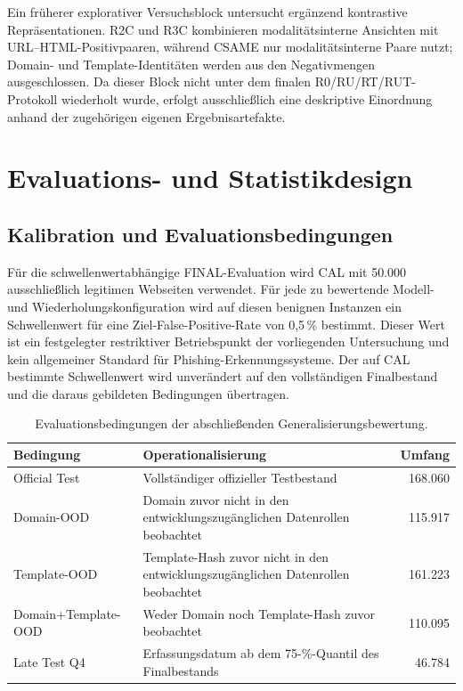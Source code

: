 Ein früherer explorativer Versuchsblock untersucht ergänzend kontrastive Repräsentationen.
R2C und R3C kombinieren modalitätsinterne Ansichten mit URL--HTML-Positivpaaren, während
CSAME nur modalitätsinterne Paare nutzt; Domain- und Template-Identitäten werden aus den
Negativmengen ausgeschlossen. Da dieser Block nicht unter dem finalen R0/RU/RT/RUT-Protokoll
wiederholt wurde, erfolgt ausschließlich eine deskriptive Einordnung anhand der
zugehörigen eigenen Ergebnisartefakte.

\section{Evaluations- und Statistikdesign}

\subsection{Kalibration und Evaluationsbedingungen}

Für die schwellenwertabhängige FINAL-Evaluation wird CAL mit 50.000 ausschließlich legitimen
Webseiten verwendet. Für jede zu bewertende Modell- und Wiederholungskonfiguration wird auf
diesen benignen Instanzen ein Schwellenwert für eine Ziel-False-Positive-Rate von 0,5\,\%
bestimmt. Dieser Wert ist ein festgelegter restriktiver Betriebspunkt der vorliegenden
Untersuchung und kein allgemeiner Standard für Phishing-Erkennungssysteme. Der auf CAL
bestimmte Schwellenwert wird unverändert auf den vollständigen Finalbestand und die daraus
gebildeten Bedingungen übertragen.

\begin{table}[htbp]
\centering
\small
\setlength{\tabcolsep}{4pt}
\renewcommand{\arraystretch}{1.12}
\caption{Evaluationsbedingungen der abschließenden Generalisierungsbewertung.}
\label{tab:testszenarien}
\begin{tabular}{p{}p{}r}
\hline
\textbf{Bedingung} & \textbf{Operationalisierung} & \textbf{Umfang} \\
\hline
Official Test & Vollständiger offizieller Testbestand & 168.060 \\
Domain-OOD & Domain zuvor nicht in den entwicklungszugänglichen Datenrollen beobachtet & 115.917 \\
Template-OOD & Template-Hash zuvor nicht in den entwicklungszugänglichen Datenrollen beobachtet & 161.223 \\
Domain+Template-OOD & Weder Domain noch Template-Hash zuvor beobachtet & 110.095 \\
Late Test Q4 & Erfassungsdatum ab dem 75-\%-Quantil des Finalbestands & 46.784 \\
\hline
\end{tabular}
\end{table}

